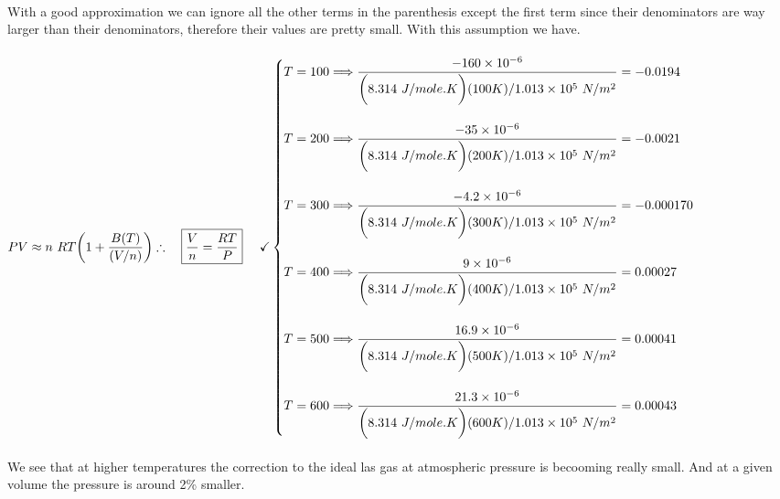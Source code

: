 \documentclass[fleqn]{article}
\begin{document}
\begin{enumerate}
\begin{enumerate}
        \textcolor{hwColor}{
          \\
          With a good approximation we can ignore all the other terms in the parenthesis except the first term since their denominators
          are way larger than their denominators, therefore their values are pretty small. With this assumption we have.
          \\
          \\
          $
            PV \approx n ~ RT \bigg(1+\dfrac{B(T)}{(V/n)}\bigg)
            \\
            \\
            \therefore ~~~ \boxed{
              \dfrac{V}{n}=\dfrac{RT}{P}
            } ~~~~ \checkmark
            \\
            \\
            \begin{cases}
              T=100 \Longrightarrow \dfrac{-160 \times 10^{-6}}{\bigg(8.314 ~ J/mole.K\bigg)(100 K)/1.013 \times 10^5 ~ N/m^2}=-0.0194
              \\
              \\
              T=200 \Longrightarrow \dfrac{-35 \times 10^{-6}}{\bigg(8.314 ~ J/mole.K\bigg)(200 K)/1.013 \times 10^5 ~ N/m^2}=-0.0021
              \\
              \\
              T=300 \Longrightarrow \dfrac{-4.2 \times 10^{-6}}{\bigg(8.314 ~ J/mole.K\bigg)(300 K)/1.013 \times 10^5 ~ N/m^2}=-0.000170
              \\
              \\
              T=400 \Longrightarrow \dfrac{9 \times 10^{-6}}{\bigg(8.314 ~ J/mole.K\bigg)(400 K)/1.013 \times 10^5 ~ N/m^2}=0.00027
              \\
              \\
              T=500 \Longrightarrow \dfrac{16.9 \times 10^{-6}}{\bigg(8.314 ~ J/mole.K\bigg)(500 K)/1.013 \times 10^5 ~ N/m^2}=0.00041
              \\
              \\
              T=600 \Longrightarrow \dfrac{21.3 \times 10^{-6}}{\bigg(8.314 ~ J/mole.K\bigg)(600 K)/1.013 \times 10^5 ~ N/m^2}=0.00043
            \end{cases}
          $
          \\
          \\
          We see that at higher temperatures the correction to the ideal las gas at atmospheric pressure is becooming really small. 
          And at a given volume the pressure is around 2\% smaller.
          \\
          \\
        }


\end{enumerate}
\end{enumerate}
\end{document}
